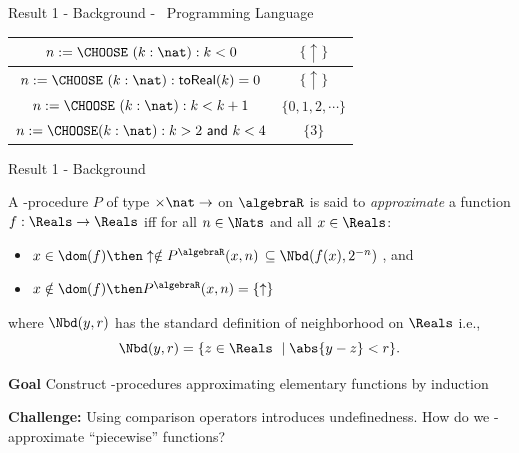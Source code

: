 \begin{frame}{Result 1 - Background - \WhileCC\ Programming Language}
\begin{minipage}[t]{0.67\linewidth}
\begin{table}[]
\begin{tabular}{|c|c|}
                \hline
                \hline
                $n := \CHOOSE\ (k : \nat) : k < 0$ & $\{\uparrow \}$\\
                \hline
                \pause $n := \CHOOSE\ (k : \nat) : \mathsf{toReal}(k) = 0$ & $\{\uparrow \}$\\
                \hline
                \pause $n := \CHOOSE\ (k : \nat) : k < k + 1$ & $\{0,1,2,\cdots\}$ \\
                \hline
                \pause $n := \CHOOSE (k : \nat) : k > 2\ \mathsf{and}\ k<4$ & $\{3 \}$\\
                \hline
            \end{tabular}
            \label{tab:placeholder}
        \end{table}
    \end{minipage}        
\end{frame}

\begin{frame}{Result 1 - Background}
    \pause
    \begin{definition}
\label{def::whileCC-approximable}
    A \WhileCC-procedure $P$ of type $\real\times\nat \to \real$ on $\algebraR$ is said to \textit{approximate} a function $f:\Reals\to\Reals$ iff for all $n\in \Nats$ and all $x\in \Reals$:
    \begin{itemize}
        \pause \item $x \in \dom(f) \then \uparrow \notin P^\algebraR(x,n) $ \pause  $\subseteq \Nbd(f(x), 2^{-n})$
            , and
        \pause \item $x \notin \dom(f) \then P^\algebraR(x, n)=\{ \uparrow\} $
    \end{itemize}
    \pause where $\Nbd(y,r)$ has the standard definition of neighborhood on $\Reals$ i.e., \[\Nbd(y,r) = \{ z\in \Reals\ \mid \abs{y-z}<r \}.\]
\end{definition}

     \pause \begin{exampleblock}{\textbf{\textcolor{OliveGreen}{Goal}}}
         Construct \WhileCC-procedures approximating elementary functions by induction
     \end{exampleblock}
     
     \pause \begin{exampleblock}{\textcolor{BrickRed}{\textbf{Challenge:} Using comparison operators introduces undefinedness.}}
        \pause How do we \WhileCC-approximate ``piecewise'' functions?
     \end{exampleblock}
\end{frame}

